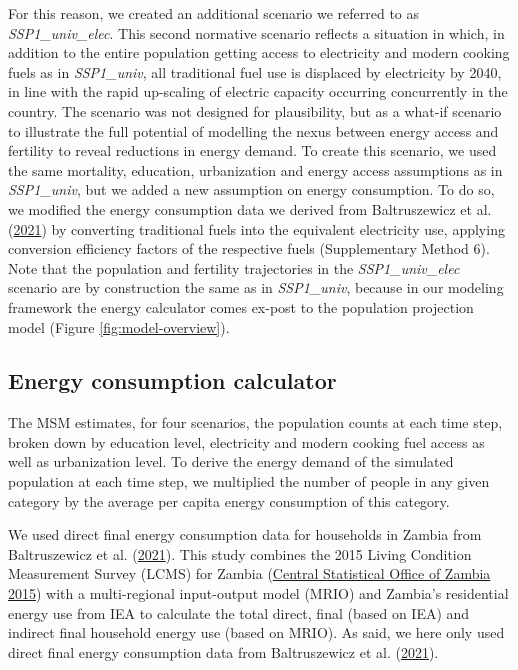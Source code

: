 \documentclass[
]{article}
\begin{document}
For this reason, we created an additional scenario we referred to as \emph{SSP1\_univ\_elec}. This second normative scenario reflects a situation in which, in addition to the entire population getting access to electricity and modern cooking fuels as in \emph{SSP1\_univ}, all traditional fuel use is displaced by electricity by 2040, in line with the rapid up-scaling of electric capacity occurring concurrently in the country. The scenario was not designed for plausibility, but as a what-if scenario to illustrate the full potential of modelling the nexus between energy access and fertility to reveal reductions in energy demand. To create this scenario, we used the same mortality, education, urbanization and energy access assumptions as in \emph{SSP1\_univ}, but we added a new assumption on energy consumption. To do so, we modified the energy consumption data we derived from Baltruszewicz et al. (\protect\hyperlink{ref-baltruszewicz_final_2021}{2021}) by converting traditional fuels into the equivalent electricity use, applying conversion efficiency factors of the respective fuels (Supplementary Method 6). Note that the population and fertility trajectories in the \emph{SSP1\_univ\_elec} scenario are by construction the same as in \emph{SSP1\_univ}, because in our modeling framework the energy calculator comes ex-post to the population projection model (Figure \ref{fig:model-overview}).

\newpage

\hypertarget{energyuse}{%
\subsection{Energy consumption calculator}\label{energyuse}}

The MSM estimates, for four scenarios, the population counts at each time step, broken down by education level, electricity and modern cooking fuel access as well as urbanization level. To derive the energy demand of the simulated population at each time step, we multiplied the number of people in any given category by the average per capita energy consumption of this category.

We used direct final energy consumption data for households in Zambia from Baltruszewicz et al. (\protect\hyperlink{ref-baltruszewicz_final_2021}{2021}). This study combines the 2015 Living Condition Measurement Survey (LCMS) for Zambia (\protect\hyperlink{ref-central_statistical_office_of_zambia_world_2015}{Central Statistical Office of Zambia 2015}) with a multi-regional input-output model (MRIO) and Zambia's residential energy use from IEA to calculate the total direct, final (based on IEA) and indirect final household energy use (based on MRIO). As said, we here only used direct final energy consumption data from Baltruszewicz et al. (\protect\hyperlink{ref-baltruszewicz_final_2021}{2021}).
\end{document}
